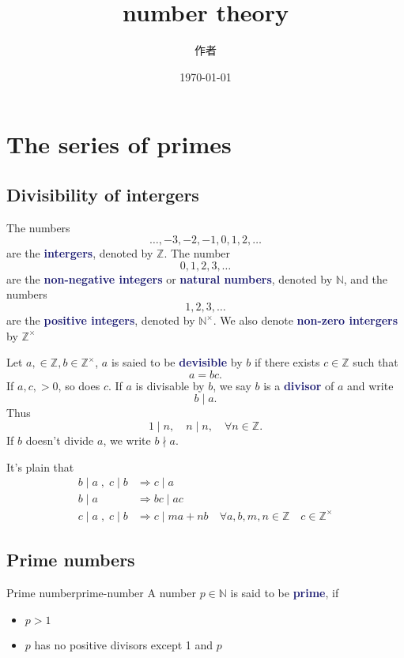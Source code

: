 \documentclass[dvipsnames]{article}
\title{number theory}
\date{\today}
\author{作者}
\newcommand{\mycola}{MidnightBlue}
\newcommand{\Cola}[1]{\textcolor{\mycola}{\textbf{#1}}}
\begin{document}
\maketitle

\section{The series of primes}

\subsection{Divisibility of intergers}

The numbers
\[ \dotsc,-3,-2,-1,0,1,2, \dotsc\]
are the \Cola{intergers}, denoted by $\mathbb{Z}$. The number
\[ 0,1,2,3,\dotsc\] are the \Cola{non-negative integers} or \Cola{natural
  numbers}, denoted by $\mathbb{N}$, and the numbers \[1,2,3,\dotsc\] are the
\Cola{positive integers}, denoted by $\mathbb{N^{\times}}$. We also denote
\Cola{non-zero intergers} by $\mathbb{Z^{\times}}$

Let $a,\in \mathbb{Z}, b \in \mathbb{Z^{\times}}$, $a$ is saied to be
\Cola{devisible} by $b$ if there exists $c \in \mathbb{Z}$ such that
\[ a = bc.\] If $a,c, > 0$, so does $c$. If $a$ is divisable by $b$, we say $b$
is a \Cola{divisor} of $a$ and write \[ b \mid a.\] Thus
\[ 1 \mid n, \quad n \mid n, \quad \forall n \in \mathbb{Z}.\] If $b$ doesn't
divide $a$, we write $b \nmid a$.

It's plain that
\begin{align*}
  b \mid a \;,\; c \mid b &\Rightarrow   c \mid a\\
  b \mid a  &\Rightarrow   bc \mid ac\\
  c \mid a \;,\; c \mid b &\Rightarrow   c \mid ma + nb \quad \forall a,b,m,n
                            \in \mathbb{Z} \quad c \in \mathbb{Z^{\times}}
\end{align*}

\subsection{Prime numbers}

\begin{myDef}{Prime number}{prime-number}
  A number $p \in \mathbb{N}$ is said to be \Cola{prime}, if
  \begin{itemize}
  \item $p > 1$
  \item $p$ has no positive divisors except 1 and $p$
  \end{itemize}
\end{myDef}
\end{document}
